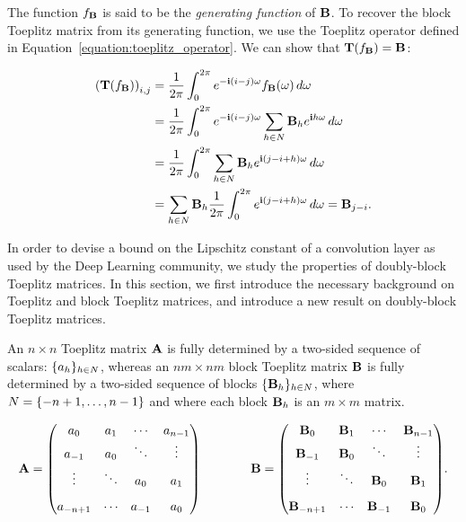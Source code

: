 {The function $f_{\mathbf{B}}$ is said to be the \emph{generating function} of $\mathbf{B}$. To recover the block Toeplitz matrix from its generating function, we use the Toeplitz operator defined in Equation~\ref{equation:toeplitz_operator}. We can show that $\mathbf{T}(f_\mathbf{B}) = \mathbf{B}$:

\begingroup
\allowdisplaybreaks
\begin{align}
    \leftmat \Tmat(f_\Bmat) \rightmat_{i, j} &= \frac{1}{2\pi} \int_0^{2\pi} e^{-\ci (i-j)\omega} f_{\Bmat}(\omega) \,d\omega  \\
    &= \frac{1}{2\pi} \int_0^{2\pi} e^{-\ci (i-j) \omega} \sum_{h \in N} \Bmat_h e^{\ci h \omega} \,d\omega  \\
    &= \frac{1}{2\pi} \int_0^{2\pi} \sum_{h \in N} \Bmat_h e^{\ci (j - i + h) \omega} \,d\omega  \\
    &= \sum_{h \in N} \Bmat_h \frac{1}{2\pi} \int_0^{2\pi} e^{\ci (j - i + h) \omega} \,d\omega 
    = \Bmat_{j-i} .
\end{align}
\endgroup




In order to devise a bound on the Lipschitz constant of a convolution layer as used by the Deep Learning community, we study the properties of doubly-block Toeplitz matrices.
In this section, we first introduce the necessary background on Toeplitz and block Toeplitz matrices, and introduce a new result on doubly-block Toeplitz matrices.



An $n \times n$ Toeplitz matrix $\mathbf{A}$ is fully determined by a two-sided sequence of scalars: $\{a_h\}_{h \in N}$, whereas an $nm\times nm$ block Toeplitz matrix $\mathbf{B}$ is fully determined by a two-sided sequence of blocks $\{\mathbf{B}_h\}_{h \in N}$, where $N = \{-n+1,\dots, n-1 \}$ and where each block $\mathbf{B}_h$ is an $m \times m$ matrix.  

\begin{equation*}
  \Amat = \leftmatrix
    a_0 & a_{1} & \cdots & a_{n-1} \\ \vspace{0.1cm}
    a_{-1} & a_0 & \ddots & \vdots \\ \vspace{0.3cm}
   \vdots & \ddots & a_{0} & a_{1} \\ 
  a_{-n+1} & \cdots  & a_{-1}    & a_0 
  \rightmatrix \quad \quad \quad \quad 
    \Bmat = \leftmatrix
    \Bmat_0 & \Bmat_{1} & \cdots & \Bmat_{n-1} \\ \vspace{0.1cm}
    \Bmat_{-1} & \Bmat_0 & \ddots & \vdots \\ \vspace{0.3cm}
   \vdots & \ddots & \Bmat_0 & \Bmat_{1} \\ 
  \Bmat_{-n+1} & \cdots  & \Bmat_{-1}  & \Bmat_0 
  \rightmatrix.
\end{equation*}

}
